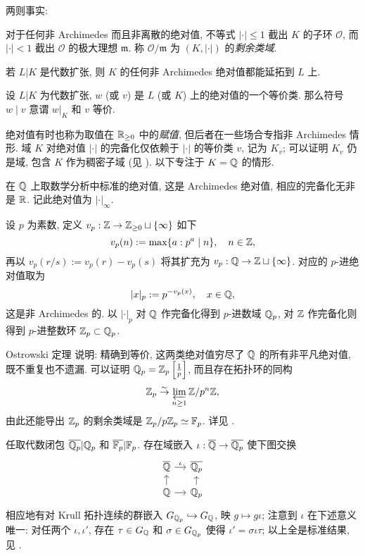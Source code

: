 两则事实:
\begin{compactitem}
	\item 对于任何非 Archimedes 而且非离散的绝对值, 不等式 $|\cdot| \leq 1$ 截出 $K$ 的子环 $\mathcal{O}$, 而 $|\cdot| < 1$ 截出 $\mathcal{O}$ 的极大理想 $\mathfrak{m}$. 称 $\mathcal{O}/\mathfrak{m}$ 为 $(K, |\cdot|)$ 的\emph{剩余类域}.
	\item 若 $L|K$ 是代数扩张, 则 $K$ 的任何非 Archimedes 绝对值都能延拓到 $L$ 上.
\end{compactitem}

\begin{convention}
	设 $L|K$ 为代数扩张, $w$ (或 $v$) 是 $L$ (或 $K$) 上的绝对值的一个等价类. 那么符号 $w \mid v$ 意谓 $w|_K$ 和 $v$ 等价.
\end{convention}

绝对值有时也称为取值在 $\mathbb{R}_{\geq 0}$ 中的\emph{赋值}, 但后者在一些场合专指非 Archimedes 情形. 域 $K$ 对绝对值 $|\cdot|$ 的完备化仅依赖于 $|\cdot|$ 的等价类 $v$, 记为 $K_v$; 可以证明 $K_v$ 仍是域, 包含 $K$ 作为稠密子域 (见 \cite[\S 10.4]{Li1}). 以下专注于 $K = \mathbb{Q}$ 的情形. 

\begin{example}
	在 $\mathbb{Q}$ 上取数学分析中标准的绝对值, 这是 Archimedes 绝对值, 相应的完备化无非是 $\mathbb{R}$. 记此绝对值为 $|\cdot|_\infty$.
\end{example}

\begin{example}[$p$-进绝对值]  
	设 $p$ 为素数, 定义 $v_p: \mathbb{Z} \to \mathbb{Z}_{\geq 0} \sqcup \{\infty\}$ 如下
	\[ v_p(n) := \max\{ a: p^a \mid n \}, \quad n \in \mathbb{Z}, \]
	再以 $v_p(r/s) := v_p(r) - v_p(s)$ 将其扩充为 $v_p: \mathbb{Q} \to \mathbb{Z} \sqcup \{\infty\}$. 对应的 $p$-进绝对值取为
	\[ |x|_p := p^{-v_p(x)}, \quad x \in \mathbb{Q}, \]
	这是非 Archimedes 的. 以 $|\cdot|_p$ 对 $\mathbb{Q}$ 作完备化得到 $p$-进数域 $\mathbb{Q}_p$, 对 $\mathbb{Z}$ 作完备化则得到 $p$-进整数环 $\mathbb{Z}_p \subset \mathbb{Q}_p$.
\end{example}

Ostrowski 定理 \cite[定理 10.4.6]{Li1} 说明: 精确到等价, 这两类绝对值穷尽了 $\mathbb{Q}$ 的所有非平凡绝对值, 既不重复也不遗漏. 可以证明 $\mathbb{Q}_p = \mathbb{Z}_p\left[\frac{1}{p}\right]$, 而且存在拓扑环的同构
\[ \mathbb{Z}_p \stackrel{\sim}{\rightarrow} \varprojlim_{n \geq 1} \mathbb{Z}/p^n \mathbb{Z}, \]
由此还能导出 $\mathbb{Z}_p$ 的剩余类域是 $\mathbb{Z}_p/p\mathbb{Z}_p \simeq \mathbb{F}_p$. 详见 \cite[例 10.2.1 + \S 10.3]{Li1}.

任取代数闭包 $\overline{\mathbb{Q}_p}|\mathbb{Q}_p$ 和 $\overline{\mathbb{F}_p}| \mathbb{F}_p$. 存在域嵌入 $\iota: \overline{\mathbb{Q}} \to \overline{\mathbb{Q}_p}$ 使下图交换
\begin{equation}\label{eqn:specialization} \begin{tikzcd}[row sep=small, column sep=small]
		\overline{\Q} \arrow[r, "\iota"] & \overline{\Q_p} \\
		\Q \arrow[r] \arrow[u] & \Q_p \arrow[u]
\end{tikzcd}\end{equation}
相应地有对 Krull 拓扑连续的群嵌入 $G_{\mathbb{Q}_p} \hookrightarrow G_{\mathbb{Q}}$, 映 $g \mapsto g \iota$; 注意到 $\iota$ 在下述意义唯一: 对任两个 $\iota, \iota'$, 存在 $\tau \in G_{\mathbb{Q}}$ 和 $\sigma \in G_{\mathbb{Q}_p}$ 使得 $\iota' = \sigma \iota \tau$; 以上全是标准结果, 见 \cite[定理 10.7.5]{Li1}.

